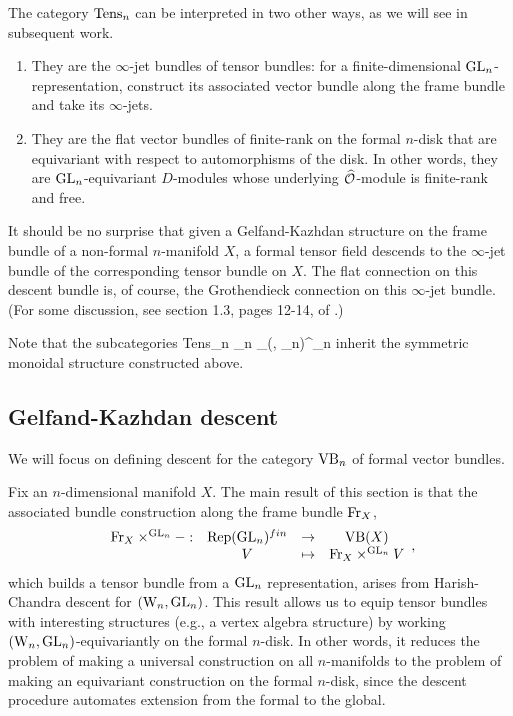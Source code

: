 \documentclass[10pt]{amsart}
\begin{document}
The category ${\rm Tens}_n$ can be interpreted in two other ways, as we will see in subsequent work.
\begin{enumerate}
\item They are the $\infty$-jet bundles of tensor bundles: for a finite-dimensional ${\rm GL}_n$-representation, 
construct its associated vector bundle along the frame bundle and take its $\infty$-jets.
\item They are the flat vector bundles of finite-rank on the formal $n$-disk that are equivariant with respect to automorphisms of the disk. 
In other words, they are ${\rm GL}_n$-equivariant $D$-modules whose underlying $\widehat{\mathcal O}$-module is finite-rank and free.
\end{enumerate}
It should be no surprise that given a Gelfand-Kazhdan structure on the frame bundle of a non-formal $n$-manifold $X$, 
a formal tensor field descends to the $\infty$-jet bundle of the corresponding tensor bundle on $X$. 
The flat connection on this descent bundle is, of course, the Grothendieck connection on this $\infty$-jet bundle. 
(For some discussion, see section 1.3, pages 12-14, of \cite{Fuks}.)

Note that the subcategories 
\ben
{\rm Tens}_n \hookrightarrow \VB_n
\hookrightarrow \Mod_{(\Vect, \GL_n)}^{\cO_n}
\een
inherit the symmetric monoidal structure constructed above. 

\subsection{Gelfand-Kazhdan descent}

We will focus on defining descent for the category ${\rm VB}_n$ of formal vector
bundles. 

Fix an $n$-dimensional manifold $X$.
The main result of this section is that the associated bundle construction along the frame bundle ${\rm Fr}_X$,
\[
\begin{array}{cccc}
{\rm Fr}_X \times^{{\rm GL}_n} - :&  {\rm Rep}({\rm GL}_n)^{fin} & \to &{\rm VB}(X)\\
& V & \mapsto & {\rm Fr}_X \times^{{\rm GL}_n} V
\end{array},
\]
which builds a tensor bundle from a ${\rm GL}_n$ representation, arises from Harish-Chandra descent for $({{\rm W}_n},{\rm GL}_n)$. 
This result allows us to equip tensor bundles with interesting structures (e.g., a vertex algebra structure) by working $({{\rm W}_n},{\rm GL}_n)$-equivariantly on the formal $n$-disk.
In other words, it reduces the problem of making a universal
construction on all $n$-manifolds to the problem of making an
equivariant construction on the formal $n$-disk,
since the descent procedure automates extension from the formal to the global.
\end{document}
